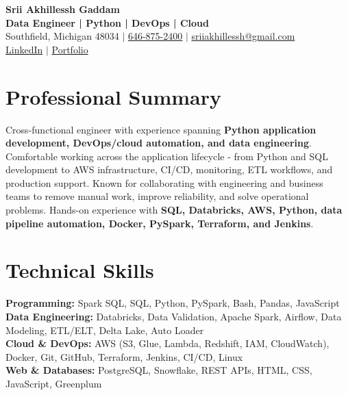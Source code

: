 \documentclass[letterpaper,10pt]{article}
\begin{document}
\fontsize{9.35pt}{10.45pt}\selectfont

\begin{center}
    {\LARGE \textbf{Srii Akhillessh Gaddam}} \\[-1pt]
    \textbf{Data Engineer | Python | DevOps | Cloud} \\[2pt]
    Southfield, Michigan 48034 $|$
    \href{tel:6468752400}{646-875-2400} $|$
    \href{mailto:sriiakhillessh@gmail.com}{sriiakhillessh@gmail.com} \\[1pt]
    \href{https://www.linkedin.com/in/srii-akhiilessh-gaddam-b48668191/}{LinkedIn} $|$
    \href{https://sriiakhillesshg.github.io/portfolio/}{Portfolio}
\end{center}
\vspace{-8pt}

\section{Professional Summary}
\small{Cross-functional engineer with experience spanning \textbf{Python application development, DevOps/cloud automation, and data engineering}. Comfortable working across the application lifecycle - from Python and SQL development to AWS infrastructure, CI/CD, monitoring, ETL workflows, and production support. Known for collaborating with engineering and business teams to remove manual work, improve reliability, and solve operational problems. Hands-on experience with \textbf{SQL, Databricks, AWS, Python, data pipeline automation, Docker, PySpark, Terraform, and Jenkins}.}

\section{Technical Skills}
\small{
\textbf{Programming:} Spark SQL, SQL, Python, PySpark, Bash, Pandas, JavaScript \\
\textbf{Data Engineering:} Databricks, Data Validation, Apache Spark, Airflow, Data Modeling, ETL/ELT, Delta Lake, Auto Loader \\
\textbf{Cloud \& DevOps:} AWS (S3, Glue, Lambda, Redshift, IAM, CloudWatch), Docker, Git, GitHub, Terraform, Jenkins, CI/CD, Linux \\
\textbf{Web \& Databases:} PostgreSQL, Snowflake, REST APIs, HTML, CSS, JavaScript, Greenplum
}

\end{document}
